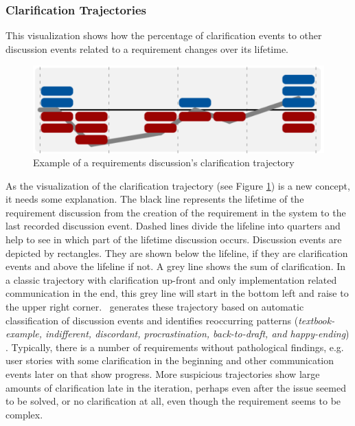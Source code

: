\subsubsection{Clarification Trajectories} 
This visualization shows how the percentage of clarification events to other discussion events related to a requirement changes over its lifetime.
\begin{figure}[b]
\includegraphics[width=\columnwidth]{img/example-trajectory}
\caption{Example of a requirements discussion's clarification trajectory}
\label{fig:example-trajectory}
\end{figure}
As the visualization of the clarification trajectory (see Figure \ref{fig:example-trajectory}) is a new concept, it needs some explanation.
The black line represents the lifetime of the requirement discussion from the creation of the requirement in the system to the last recorded discussion event.
Dashed lines divide the lifeline into quarters and help to see in which part of the lifetime discussion occurs.
Discussion events are depicted by rectangles.
They are shown below the lifeline, if they are clarification events and above the lifeline if not.
A grey line shows the sum of clarification.
In a classic trajectory with clarification up-front and only implementation related communication in the end, this grey line will start in the bottom left and raise to the upper right corner.
\viss\ generates these trajectory based on automatic classification of discussion events and identifies reoccurring patterns (\emph{textbook-example, indifferent, discordant, procrastination, back-to-draft, and happy-ending}) \cite{Knauss2012f}.
Typically, there is a number of requirements without pathological findings, e.g. user stories with some clarification in the beginning and other communication events later on that show progress.
More suspicious trajectories show large amounts of clarification late in the iteration, perhaps even after the issue seemed to be solved, or no clarification at all, even though the requirement seems to be complex.

